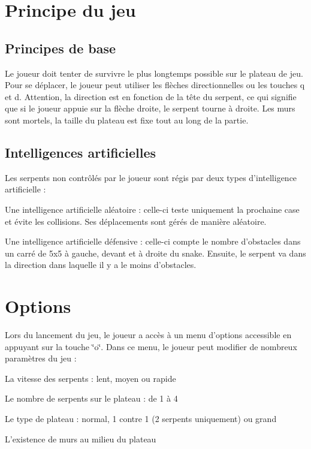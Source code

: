 \par
 \hypertarget{index_jeu}{}\section{Principe du jeu}\label{index_jeu}
\hypertarget{index_jeu_base}{}\subsection{Principes de base}\label{index_jeu_base}
Le joueur doit tenter de survivre le plus longtemps possible sur le plateau de jeu. Pour se déplacer, le joueur peut utiliser les flèches directionnelles ou les touches q et d. Attention, la direction est en fonction de la tête du serpent, ce qui signifie que si le joueur appuie sur la flèche droite, le serpent tourne à droite. Les murs sont mortels, la taille du plateau est fixe tout au long de la partie.\hypertarget{index_jeu_ia}{}\subsection{Intelligences artificielles}\label{index_jeu_ia}
Les serpents non contrôlés par le joueur sont régis par deux types d'intelligence artificielle \-:
\begin{DoxyItemize}
\item Une intelligence artificielle aléatoire \-: celle-\/ci teste uniquement la prochaine case et évite les collisions. Ses déplacements sont gérés de manière aléatoire.
\item Une intelligence artificielle défensive \-: celle-\/ci compte le nombre d'obstacles dans un carré de 5x5 à gauche, devant et à droite du snake. Ensuite, le serpent va dans la direction dans laquelle il y a le moins d'obstacles.
\end{DoxyItemize}

\par
 \hypertarget{index_options}{}\section{Options}\label{index_options}
Lors du lancement du jeu, le joueur a accès à un menu d'options accessible en appuyant sur la touche \char`\"{}o\char`\"{}. Dans ce menu, le joueur peut modifier de nombreux paramètres du jeu \-:
\begin{DoxyItemize}
\item La vitesse des serpents \-: lent, moyen ou rapide
\item Le nombre de serpents sur le plateau \-: de 1 à 4
\item Le type de plateau \-: normal, 1 contre 1 (2 serpents uniquement) ou grand
\item L'existence de murs au milieu du plateau 
\end{DoxyItemize}